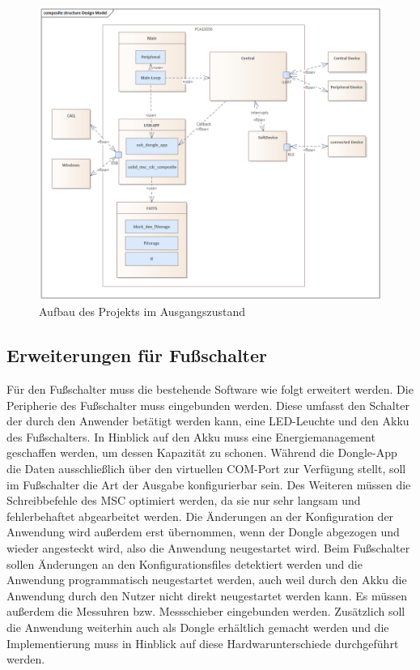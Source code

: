 \begin{figure}[H] 
	\centering
	\includegraphics[width=\textwidth]{figures/Design_Model.png}
	\caption{Aufbau des Projekts im Ausgangszustand}
\end{figure}


\subsection{Erweiterungen für Fußschalter}
Für den Fußschalter muss die bestehende Software wie folgt erweitert werden. Die Peripherie des Fußschalter muss eingebunden werden. Diese umfasst den Schalter der durch den Anwender betätigt werden kann, eine LED-Leuchte und den Akku des Fußschalters. In Hinblick auf den Akku muss eine Energiemanagement geschaffen werden, um dessen Kapazität zu schonen. Während die Dongle-App die Daten ausschließlich über den virtuellen COM-Port zur Verfügung stellt, soll im Fußschalter die Art der Ausgabe konfigurierbar sein. Des Weiteren müssen die Schreibbefehle des \ac{MSC} optimiert werden, da sie nur sehr langsam und fehlerbehaftet abgearbeitet werden. Die Änderungen an der Konfiguration der Anwendung wird außerdem erst übernommen, wenn der Dongle abgezogen und wieder angesteckt wird, also die Anwendung neugestartet wird. Beim Fußschalter sollen Änderungen an den Konfigurationsfiles detektiert werden und die Anwendung programmatisch neugestartet werden, auch weil durch den Akku die Anwendung durch den Nutzer nicht direkt neugestartet werden kann. Es müssen außerdem die Messuhren bzw. Messschieber eingebunden werden. Zusätzlich soll die Anwendung weiterhin auch als Dongle erhältlich gemacht werden und die Implementierung muss in Hinblick auf diese Hardwarunterschiede durchgeführt werden.